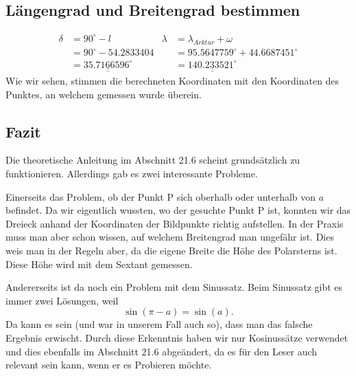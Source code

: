 \subsection{Längengrad und Breitengrad bestimmen}

\begin{align*}
\delta &= 90^\circ - l &
	\lambda &= \lambda_{Arktur} + \omega \\
&= 90^\circ - 54.2833404 &
	&= 95.5647759^\circ + 44.6687451^\circ \\
&= \underline{\underline{35.7166596^\circ}} &
	&= \underline{\underline{140.233521^\circ}} 
\end{align*}
Wie wir sehen, stimmen die berechneten Koordinaten mit den Koordinaten des Punktes, an welchem gemessen wurde überein. 

\subsection{Fazit}
Die theoretische Anleitung im Abschnitt 21.6 scheint grundsätzlich zu funktionieren. 
Allerdings gab es zwei interessante Probleme.

Einerseits das Problem, ob der Punkt P sich oberhalb oder unterhalb von $a$ befindet. 
Da wir eigentlich wussten, wo der gesuchte Punkt P ist, konnten wir das Dreieck anhand der Koordinaten der Bildpunkte richtig aufstellen. 
In der Praxis muss man aber schon wissen, auf welchem Breitengrad man ungefähr ist. 
Dies weis man in der Regeln aber, da die eigene Breite die Höhe des Polarsterns ist.
Diese Höhe wird mit dem Sextant gemessen.

Andererseits ist da noch ein Problem mit dem Sinussatz.
Beim Sinussatz gibt es immer zwei Lösungen, weil \[ \sin(\pi-a)=\sin(a).\]
Da kann es sein (und war in unserem Fall auch so), dass man das falsche Ergebnis erwischt. 
Durch diese Erkenntnis haben wir nur Kosinussätze verwendet und dies ebenfalls im Abschnitt 21.6 abgeändert, da es für den Leser auch relevant sein kann, wenn er es Probieren möchte.




